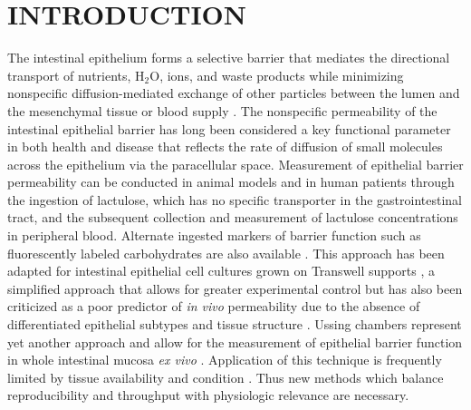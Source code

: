 \documentclass[11pt]{article}
\begin{document}
\section*{INTRODUCTION}
The intestinal epithelium forms a selective barrier that mediates the directional transport of nutrients, H\(_{\text{2}}\)O, ions, and waste products while minimizing nonspecific diffusion-mediated exchange of other particles between the lumen and the mesenchymal tissue or blood supply \supercite{standring2008gray,Buckley:2017}. The nonspecific permeability of the intestinal epithelial barrier has long been considered a key functional parameter in both health and disease \supercite{Clayburgh:2004,Turner:2009,Bischoff:2014,Odenwald:2017} that reflects the rate of diffusion of small molecules across the epithelium via the paracellular space. Measurement of epithelial barrier permeability can be conducted in animal models \supercite{Krugliak:1994} and in human patients \supercite{Johnston:2001} through the ingestion of lactulose, which has no specific transporter in the gastrointestinal tract, and the subsequent collection and measurement of lactulose concentrations in peripheral blood. Alternate ingested markers of barrier function such as fluorescently labeled carbohydrates are also available \supercite{Salles_Teixeira:2014,Wang:2015}. This approach has been adapted for intestinal epithelial cell cultures grown on Transwell supports \supercite{Donato:2011}, a simplified approach that allows for greater experimental control but has also been criticized as a poor predictor of \emph{in vivo} permeability  due to the absence of differentiated epithelial subtypes and tissue structure \supercite{Balimane:2005}. Ussing chambers represent yet another approach and allow for the measurement of epithelial barrier function in whole intestinal mucosa \emph{ex vivo} \supercite{Vidyasagar:2016}. Application of this technique is frequently limited by tissue availability and condition \supercite{Vidyasagar:2016,Herrmann:2016}. Thus new methods which balance reproducibility and throughput with physiologic relevance are necessary.\\
\end{document}
